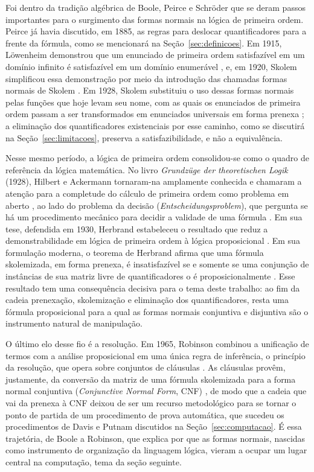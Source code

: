 \documentclass[12pt,a4paper,oneside]{report}
\theoremstyle{tituloplain}
\theoremstyle{titulodef}
\begin{document}
Foi dentro da tradição algébrica de Boole, Peirce e Schröder que se deram passos importantes para o surgimento das formas normais na lógica de primeira ordem. Peirce já havia discutido, em 1885, as regras para deslocar quantificadores para a frente da fórmula, como se mencionará na Seção~\ref{sec:definicoes}. Em 1915, Löwenheim demonstrou que um enunciado de primeira ordem satisfazível em um domínio infinito é satisfazível em um domínio enumerável \cite{lowenheim1915,burris2021}, e, em 1920, Skolem simplificou essa demonstração por meio da introdução das chamadas formas normais de Skolem \cite{skolem1920,burris2021}. Em 1928, Skolem substituiu o uso dessas formas normais pelas funções que hoje levam seu nome, com as quais os enunciados de primeira ordem passam a ser transformados em enunciados universais em forma prenexa \cite{skolem1928,burris2021}; a eliminação dos quantificadores existenciais por esse caminho, como se discutirá na Seção~\ref{sec:limitacoes}, preserva a satisfazibilidade, e não a equivalência.

Nesse mesmo período, a lógica de primeira ordem consolidou-se como o quadro de referência da lógica matemática. No livro \textit{Grundzüge der theoretischen Logik} (1928), Hilbert e Ackermann tornaram-na amplamente conhecida e chamaram a atenção para a completude do cálculo de primeira ordem como problema em aberto \cite{hilbertackermann1928,ewald2018}, ao lado do problema da decisão (\textit{Entscheidungsproblem}), que pergunta se há um procedimento mecânico para decidir a validade de uma fórmula \cite{hilbertackermann1928}. Em sua tese, defendida em 1930, Herbrand estabeleceu o resultado que reduz a demonstrabilidade em lógica de primeira ordem à lógica proposicional \cite{herbrand1930,wirth2014}. Em sua formulação moderna, o teorema de Herbrand afirma que uma fórmula skolemizada, em forma prenexa, é insatisfazível se e somente se uma conjunção de instâncias de sua matriz livre de quantificadores o é proposicionalmente \cite{Zach2024Logic}. Esse resultado tem uma consequência decisiva para o tema deste trabalho: ao fim da cadeia prenexação, skolemização e eliminação dos quantificadores, resta uma fórmula proposicional para a qual as formas normais conjuntiva e disjuntiva são o instrumento natural de manipulação.

O último elo desse fio é a resolução. Em 1965, Robinson combinou a unificação de termos com a análise proposicional em uma única regra de inferência, o princípio da resolução, que opera sobre conjuntos de cláusulas \cite{robinson1965,Zach2024Logic}. As cláusulas provêm, justamente, da conversão da matriz de uma fórmula skolemizada para a forma normal conjuntiva (\textit{Conjunctive Normal Form}, CNF) \cite{Zach2024Logic}, de modo que a cadeia que vai da prenexa à CNF deixou de ser um recurso metodológico para se tornar o ponto de partida de um procedimento de prova automática, que sucedeu os procedimentos de Davis e Putnam discutidos na Seção~\ref{sec:computacao}. É essa trajetória, de Boole a Robinson, que explica por que as formas normais, nascidas como instrumento de organização da linguagem lógica, vieram a ocupar um lugar central na computação, tema da seção seguinte.
\end{document}
